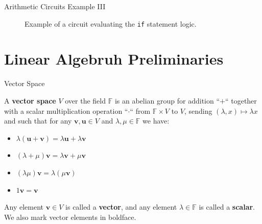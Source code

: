 \documentclass{beamer}
\begin{document}
\begin{frame}[fragile]{Arithmetic Circuits Example III}
\begin{figure}[h!]
            \caption{Example of a circuit evaluating the \texttt{if} statement logic.}
            \label{fig:multivariate-polynomial-circuit}
        \end{figure}
    \end{frame}

    \section{Linear Algebruh Preliminaries}

    \begin{frame}{Vector Space}
        \begin{definition}
            A \textbf{vector space} $V$ over the field $\mathbb{F}$ is an abelian group for addition
            ``$+$`` together with a scalar multiplication operation ``$\cdot$`` from $\mathbb{F} \times V$
            to $V$, sending $(\lambda,x) \mapsto \lambda x$ and such that for any 
            $\mathbf{v},\mathbf{u} \in V$ and $\lambda,\mu \in \mathbb{F}$ we have:
            \begin{itemize}
                \item $\lambda(\mathbf{u}+\mathbf{v}) = \lambda \mathbf{u} + \lambda \mathbf{v}$
                \item $(\lambda + \mu)\mathbf{v} = \lambda \mathbf{v} + \mu \mathbf{v}$
                \item $(\lambda \mu)\mathbf{v} = \lambda(\mu \mathbf{v})$
                \item $1\mathbf{v} = \mathbf{v}$
            \end{itemize}

            Any element $\mathbf{v} \in V$ is called a \textbf{vector}, and any element
            $\lambda \in \mathbb{F}$ is called a \textbf{scalar}. We also mark vector elements in 
            boldface.
        \end{definition}
    \end{frame}
\end{document}
